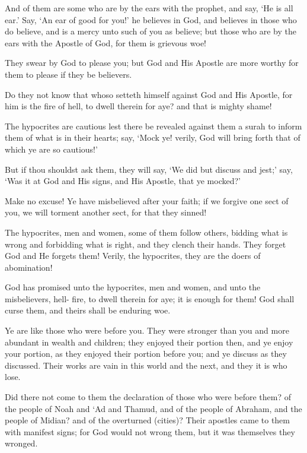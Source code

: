 \documentclass[fontsize=14pt, letterpaper, notitlepage, openany, DIV=12]{scrbook} %
\begin{document}
\noindent[9:61]
And of them are some who are by the ears with the prophet, and say, `He is all ear.' Say,
`An ear of good for you!' he believes in God, and believes in those who do believe, and is a
mercy unto such of you as believe; but those who are by the ears with the Apostle of God, for
them is grievous woe!

\noindent[9:62]
They swear by God to please you; but God and His Apostle are more worthy for them to
please if they be believers.

\noindent[9:63]
Do they not know that whoso setteth himself against God and His Apostle, for him is the
fire of hell, to dwell therein for aye? and that is mighty shame!

\noindent[9:64]
The hypocrites are cautious lest there be revealed against them a surah to inform them of
what is in their hearts; say, `Mock ye! verily, God will bring forth that of which ye are so
cautious!'

\noindent[9:65]
But if thou shouldst ask them, they will say, `We did but discuss and jest;' say, `Was it at
God and His signs, and His Apostle, that ye mocked?'

\noindent[9:66]
Make no excuse! Ye have misbelieved after your faith; if we forgive one sect of you, we
will torment another sect, for that they sinned!

\noindent[9:67]
The hypocrites, men and women, some of them follow others, bidding what is wrong and
forbidding what is right, and they clench their hands. They forget God and He forgets them!
Verily, the hypocrites, they are the doers of abomination!

\noindent[9:68]
God has promised unto the hypocrites, men and women, and unto the misbelievers, hell-
fire, to dwell therein for aye; it is enough for them! God shall curse them, and theirs shall be
enduring woe.

\noindent[9:69]
Ye are like those who were before you. They were stronger than you and more abundant
in wealth and children; they enjoyed their portion then, and ye enjoy your portion, as they
enjoyed their portion before you; and ye discuss as they discussed. Their works are vain in this
world and the next, and they it is who lose.

\noindent[9:70]
Did there not come to them the declaration of those who were before them? of the people
of Noah and `Ad and Thamud, and of the people of Abraham, and the people of Midian? and of
the overturned (cities)? Their apostles came to them with manifest signs; for God would not
wrong them, but it was themselves they wronged.
\end{document}
